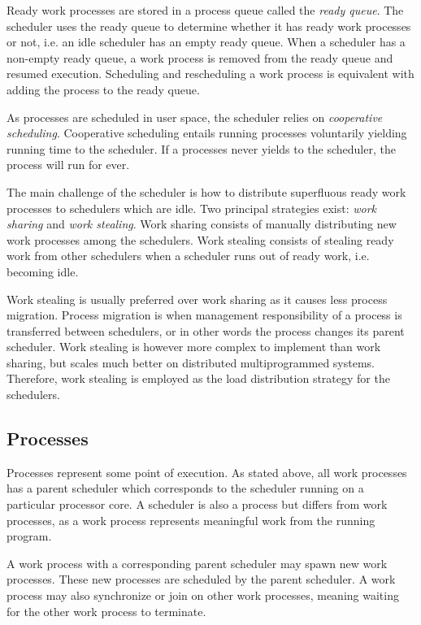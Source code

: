 Ready work processes are stored in a process queue called the \textit{ready queue}. The scheduler uses the ready queue to determine whether it has ready work processes or not, i.e. an idle scheduler has an empty ready queue. When a scheduler has a non\hyp{}empty ready queue, a work process is removed from the ready queue and resumed execution. Scheduling and rescheduling a work process is equivalent with adding the process to the ready queue.

As processes are scheduled in user space, the scheduler relies on \textit{cooperative scheduling}. Cooperative scheduling entails running processes voluntarily yielding running time to the scheduler. If a processes never yields to the scheduler, the process will run for ever. 

The main challenge of the scheduler is how to distribute superfluous ready work processes to schedulers which are idle. Two principal strategies exist: \textit{work sharing} and \textit{work stealing}. Work sharing consists of manually distributing new work processes among the schedulers. Work stealing consists of stealing ready work from other schedulers when a scheduler runs out of ready work, i.e. becoming idle. 

Work stealing is usually preferred over work sharing as it causes less process migration. Process migration is when management responsibility of a process is transferred between schedulers, or in other words the process changes its parent scheduler. Work stealing is however more complex to implement than work sharing, but scales much better on distributed multiprogrammed systems. Therefore, work stealing is employed as the load distribution strategy for the schedulers.


\subsection{Processes}
\label{subsec:processes}


Processes represent some point of execution. As stated above, all work processes has a parent scheduler which corresponds to the scheduler running on a particular processor core. A scheduler is also a process but differs from work processes, as a work process represents meaningful work from the running program. 

A work process with a corresponding parent scheduler may spawn new work processes. These new processes are scheduled by the parent scheduler. A work process may also synchronize or join on other work processes, meaning waiting for the other work process to terminate. 

